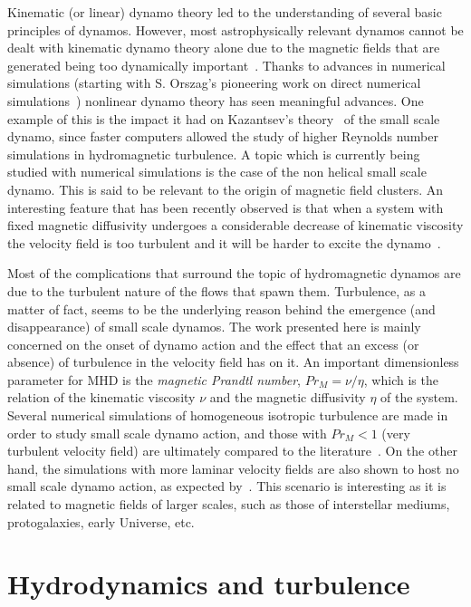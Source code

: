 \documentclass[12pt,a4paper]{report}
\begin{document}
Kinematic (or linear) dynamo theory led to the understanding of several basic principles of dynamos. However, most astrophysically relevant dynamos cannot be dealt with kinematic dynamo theory alone due to the magnetic fields that are generated being too dynamically important~\cite{brandenburg2005astrophysical}. Thanks to advances in numerical simulations (starting with S. Orszag's pioneering work on direct numerical simulations~\cite{orszag1970analytical}) nonlinear dynamo theory has seen meaningful advances. One example of this is the impact it had on Kazantsev's theory~\cite{kazantsev1968enhancement} of the small scale dynamo, since faster computers allowed the study of higher Reynolds number simulations in hydromagnetic turbulence. A topic which is currently being studied with numerical simulations is the case of the non helical small scale dynamo. This is said to be relevant to the origin of magnetic field clusters. An interesting feature that has been recently observed is that when a system with fixed magnetic diffusivity undergoes a considerable decrease of kinematic viscosity the velocity field is too turbulent and it will be harder to excite the dynamo~\cite{schekochihin2004critical}. 

Most of the complications that surround the topic of hydromagnetic dynamos are due to the turbulent nature of the flows that spawn them. Turbulence, as a matter of fact, seems to be the underlying reason behind the emergence (and disappearance) of small scale dynamos. The work presented here is mainly concerned on the onset of dynamo action and the effect that an excess (or absence) of turbulence in the velocity field has on it. An important dimensionless parameter for MHD is the \textit{magnetic Prandtl number}, $Pr_M=\nu/\eta$, which is the relation of the kinematic viscosity $\nu$ and the magnetic diffusivity $\eta$ of the system. Several numerical simulations of homogeneous isotropic turbulence are made in order to study small scale dynamo action, and those with $Pr_M<1$ (very turbulent velocity field) are ultimately compared to the literature~\cite{schekochihin2004critical}. On the other hand, the simulations with more laminar velocity fields are also shown to host no small scale dynamo action, as expected by~\cite{schnack2009lectures}. This scenario is interesting as it is related to magnetic fields of larger scales, such as those of interstellar mediums, protogalaxies, early Universe, etc.~\cite{schekochihin2002small}


\chapter{Hydrodynamics and turbulence}
\end{document}
